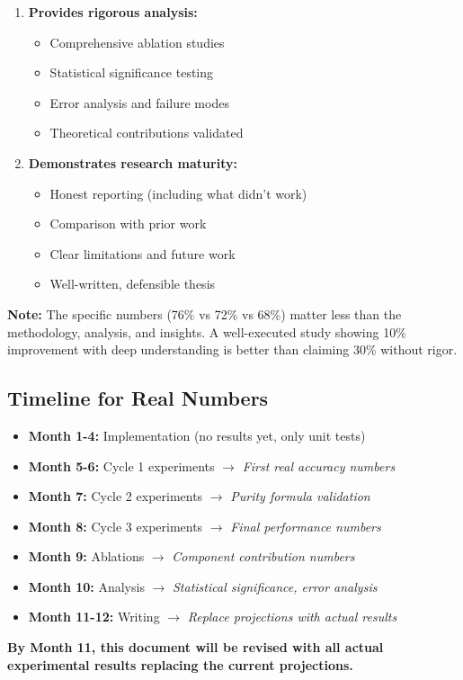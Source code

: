 \documentclass[12pt,a4paper]{article}
\theoremstyle{definition}
\begin{document}
\begin{tcolorbox}[
    colback=yellow!10!white,
    colframe=orange!75!black,
    title={\Large\textbf{IMPORTANT: About the Numbers in This Document}},
    breakable,
    enhanced,
    fontupper=\normalsize
]
\begin{enumerate}
    \item \textbf{Provides rigorous analysis:}
    \begin{itemize}
        \item Comprehensive ablation studies
        \item Statistical significance testing
        \item Error analysis and failure modes
        \item Theoretical contributions validated
    \end{itemize}
    
    \item \textbf{Demonstrates research maturity:}
    \begin{itemize}
        \item Honest reporting (including what didn't work)
        \item Comparison with prior work
        \item Clear limitations and future work
        \item Well-written, defensible thesis
    \end{itemize}
\end{enumerate}

\textbf{Note:} The specific numbers (76\% vs 72\% vs 68\%) matter less than the methodology, analysis, and insights. A well-executed study showing 10\% improvement with deep understanding is better than claiming 30\% without rigor.

\subsection*{Timeline for Real Numbers}

\begin{itemize}
    \item \textbf{Month 1-4:} Implementation (no results yet, only unit tests)
    \item \textbf{Month 5-6:} Cycle 1 experiments $\rightarrow$ \textit{First real accuracy numbers}
    \item \textbf{Month 7:} Cycle 2 experiments $\rightarrow$ \textit{Purity formula validation}
    \item \textbf{Month 8:} Cycle 3 experiments $\rightarrow$ \textit{Final performance numbers}
    \item \textbf{Month 9:} Ablations $\rightarrow$ \textit{Component contribution numbers}
    \item \textbf{Month 10:} Analysis $\rightarrow$ \textit{Statistical significance, error analysis}
    \item \textbf{Month 11-12:} Writing $\rightarrow$ \textit{Replace projections with actual results}
\end{itemize}

\textbf{By Month 11, this document will be revised with all actual experimental results replacing the current projections.}

\end{tcolorbox}
\end{document}
